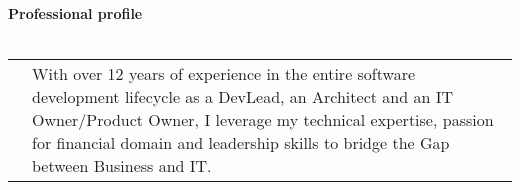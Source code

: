 \textbf{Professional profile}
\\
\\
\begin{tabular}{p{}|p{}}
&With over 12 years of experience in the entire software development lifecycle as a DevLead, an Architect and an IT Owner/Product Owner, I leverage my technical expertise, passion for financial domain and leadership skills to bridge the Gap between Business and IT.\\
\end{tabular}
\\